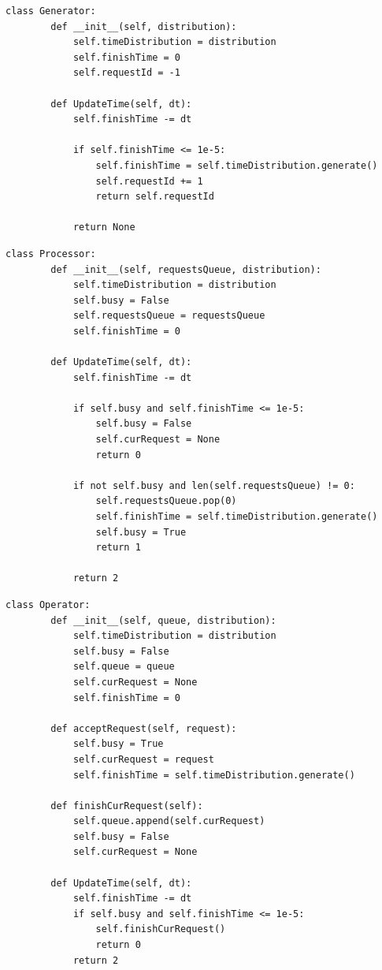 \documentclass[14pt, a4paper]{extarticle}
\begin{document}
	\begin{lstlisting}[caption=Generator.py]
	class Generator:
		def __init__(self, distribution):
			self.timeDistribution = distribution
			self.finishTime = 0
			self.requestId = -1
		
		def UpdateTime(self, dt):
			self.finishTime -= dt
		
			if self.finishTime <= 1e-5:
				self.finishTime = self.timeDistribution.generate()
				self.requestId += 1
				return self.requestId
			
			return None	
	\end{lstlisting}
	
	\newpage
	\begin{lstlisting}[caption=Processor.py]
	class Processor:
		def __init__(self, requestsQueue, distribution):
			self.timeDistribution = distribution
			self.busy = False
			self.requestsQueue = requestsQueue
			self.finishTime = 0
		
		def UpdateTime(self, dt):
			self.finishTime -= dt
			
			if self.busy and self.finishTime <= 1e-5:
				self.busy = False
				self.curRequest = None
				return 0
		
			if not self.busy and len(self.requestsQueue) != 0:
				self.requestsQueue.pop(0)
				self.finishTime = self.timeDistribution.generate()
				self.busy = True
				return 1
		
			return 2	
	\end{lstlisting}	

	\begin{lstlisting}[caption=Operator.py]
	class Operator:
		def __init__(self, queue, distribution):
			self.timeDistribution = distribution
			self.busy = False
			self.queue = queue
			self.curRequest = None
			self.finishTime = 0
			
		def acceptRequest(self, request):
			self.busy = True
			self.curRequest = request
			self.finishTime = self.timeDistribution.generate()
		
		def finishCurRequest(self):
			self.queue.append(self.curRequest)
			self.busy = False
			self.curRequest = None
		
		def UpdateTime(self, dt):
			self.finishTime -= dt
			if self.busy and self.finishTime <= 1e-5:
				self.finishCurRequest()
				return 0
			return 2	
	\end{lstlisting}
\end{document}

